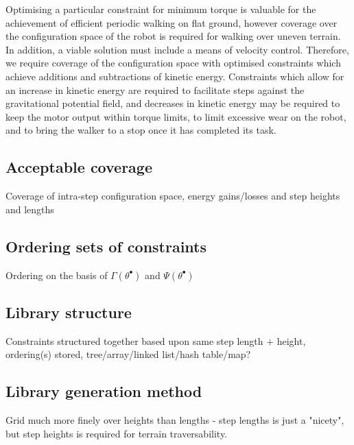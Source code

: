 Optimising a particular constraint for minimum torque is valuable for the achievement of efficient periodic walking on flat ground, however coverage over the configuration space of the robot is required for walking over uneven terrain. In addition, a viable solution must include a means of velocity control. Therefore, we require coverage of the configuration space with optimised constraints which achieve additions and subtractions of kinetic energy. Constraints which allow for an increase in kinetic energy are required to facilitate steps against the gravitational potential field, and decreases in kinetic energy may be required to keep the motor output within torque limits, to limit excessive wear on the robot, and to bring the walker to a stop once it has completed its task.

\subsection{Acceptable coverage}
Coverage of intra-step configuration space, energy gains/losses and step heights and lengths

\subsection{Ordering sets of constraints}
Ordering on the basis of $\Gamma(\theta^\bullet)$ and $\Psi(\theta^\bullet)$

\subsection{Library structure}
Constraints structured together based upon same step length + height, ordering(s) stored, tree/array/linked list/hash table/map?

\subsection{Library generation method}
Grid much more finely over heights than lengths - step lengths is just a "nicety", but step heights is required for terrain traversability.